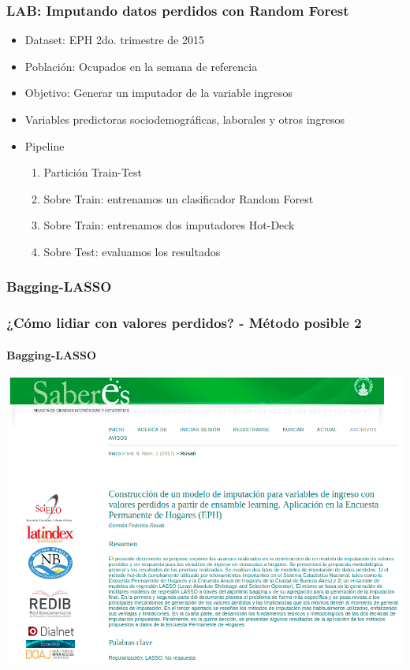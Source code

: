 \documentclass{beamer}
\begin{document}
\begin{frame}
	\frametitle{LAB: Imputando datos perdidos con Random Forest}
	\begin{itemize}		
		\item Dataset: EPH 2do. trimestre de 2015
		\item Población: Ocupados en la semana de referencia
		\item Objetivo: Generar un imputador de la variable ingresos
		\item{Variables predictoras sociodemográficas, laborales y otros ingresos}
		\item Pipeline
		\begin{enumerate}
		\item Partición Train-Test
		\item Sobre Train: entrenamos un clasificador Random Forest
		\item Sobre Train: entrenamos dos imputadores Hot-Deck
		\item Sobre Test: evaluamos los resultados
		\end{enumerate}
	\end{itemize}
\end{frame}

\subsubsection{Bagging-LASSO}
\begin{frame}
	\frametitle{¿Cómo lidiar con valores perdidos? - Método posible 2}
	\framesubtitle{Bagging-LASSO}
	\centering
	\includegraphics[width=0.7\linewidth, height=0.7\textheight]{img/saberes}

\end{frame}
\end{document}
